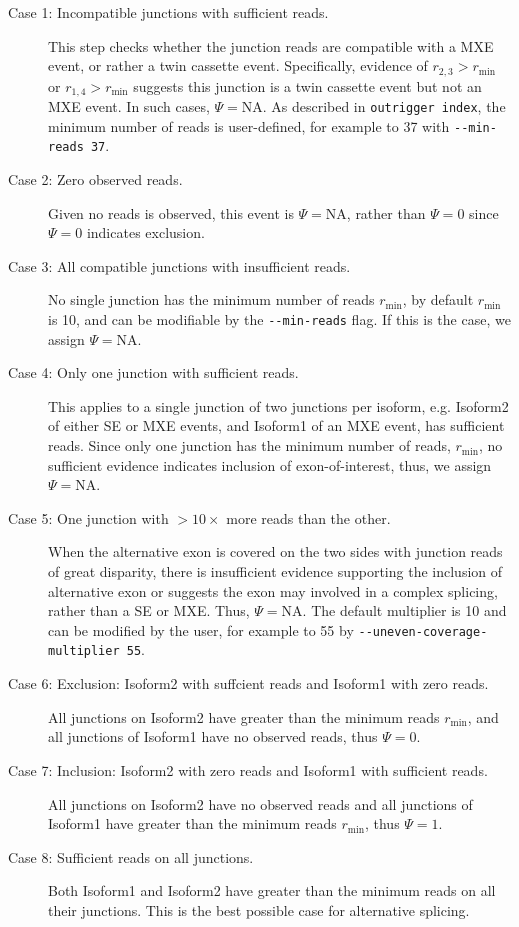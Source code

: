 \begin{description}
	\item[Case 1: Incompatible junctions with sufficient reads.] This step checks whether the junction reads are compatible with a MXE event, or rather a twin cassette event. Specifically, evidence of  $r_{2,3} > r_{\min}$ or $r_{1,4} > r_{\min}$ suggests this junction is a twin cassette event but not an MXE event. In such cases, $\Psi = \text{NA}$. As described in \texttt{outrigger index}, the minimum number of reads is user-defined, for example to 37 with \texttt{-{}-min-reads~37}. 
	\item[Case 2: Zero observed reads.] Given no reads is observed, this event is $\Psi = \text{NA}$, rather than $\Psi=0$ since $\Psi=0$ indicates exclusion. 
	\item[Case 3: All compatible junctions with insufficient reads.] No single junction has the minimum number of reads $r_{\min}$, by default $r_{\min}$ is 10, and can be modifiable by the \texttt{-{}-min-reads} flag. If this is the case, we assign $\Psi = \text{NA}$.
	\item[Case 4: Only one junction with sufficient reads.] This applies to a single junction of two junctions per isoform, e.g. Isoform2 of either SE or MXE events, and Isoform1 of an MXE event, has sufficient reads. Since only one junction has the minimum number of reads, $r_{\min}$, no sufficient evidence indicates inclusion of exon-of-interest, thus, we assign $\Psi = \text{NA}$.
	\item[Case 5: One junction with $>10\times$ more reads than the other.] When the alternative exon is covered on the two sides with junction reads of great disparity, there is insufficient evidence supporting the inclusion of alternative exon or suggests the exon may involved in a complex splicing, rather than a SE or MXE. Thus, $\Psi = \text{NA}$. The default multiplier is 10 and can be modified by the user, for example to 55 by \texttt{-{}-uneven-coverage-multiplier~55}. 
	\item[Case 6: Exclusion: Isoform2 with suffcient reads and Isoform1 with zero reads.] All junctions on Isoform2 have greater than the minimum reads $r_{\min}$, and all junctions of Isoform1 have no observed reads, thus $\Psi = 0$.
	\item[Case 7: Inclusion: Isoform2 with zero reads and Isoform1 with sufficient reads.] All junctions on Isoform2 have no observed reads and all junctions of Isoform1 have greater than the minimum reads $r_{\min}$, thus $\Psi = 1$.
	\item[Case 8: Sufficient reads on all junctions.] Both Isoform1 and Isoform2 have greater than the minimum reads on all their junctions. This is the best possible case for alternative splicing.

\end{description}
